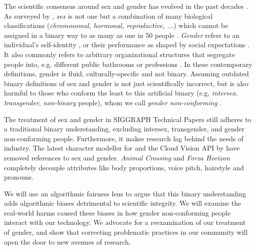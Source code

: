 \documentclass[sigconf,balance=false]{acmart}
\begin{document}






The scientific consensus around sex and gender has evolved in the past decades \cite{pmid30377332}. As surveyed by \citet{fausto2012sex}, \emph{sex} is not one but a combination of many biological classifications (\emph{chromosomal, hormonal, reproductive, ...}) which cannot be assigned in a binary way to as many as one in 50 people \cite{blackless2000sexually}.
\emph{Gender} refers to an individual's self-identity \cite{money1972man}, or their performance as shaped by social expectations \cite{butler2003gender}. It also commonly refers to arbitrary organizational structures that segregate people into, e.g. different public bathrooms or professions \cite{lorber1994paradoxes}. In these contemporary definitions, gender is fluid, culturally-specific and not binary. Assuming outdated binary definitions of sex and gender is not just scientifically incorrect, but is also harmful to those who conform the least to this artificial binary (e.g, \emph{intersex}, \emph{transgender}, \emph{non-binary} people), whom we call \emph{gender non-conforming} \cite{un2015report}.

The treatment of sex and gender in SIGGRAPH Technical Papers
still adheres to a traditional binary understanding, excluding intersex, transgender, and
gender non-conforming people. Furthermore, it makes research lag behind the needs of industry. The latest character modeller for \citet{metahuman} and the Cloud Vision API by \citet{googlegender} have removed references to sex and gender. \emph{Animal Crossing} and \emph{Forza Horizon} completely decouple attributes like body proportions, voice pitch, hairstyle and pronouns. 

We will use an algorithmic fairness lens to argue that this binary understanding adds algorithmic biases detrimental to scientific integrity.
We will examine the real-world harms caused these biases in how gender non-conforming people interact with
our technology. We advocate for a reexamination of our treatment of gender, and show that correcting problematic practices in
our community will open the door to new avenues of research.
\end{document}
